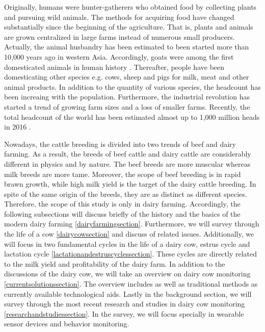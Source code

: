 \documentclass[english,12pt,a4paper,pdftex,elec,utf8]{aaltothesis}
\begin{document}
Originally, humans were hunter-gatherers who obtained food by collecting plants and pursuing wild animals. The methods for acquiring food have changed substantially since the beginning of the agriculture. That is, plants and animals are grown centralized in large farms instead of numerous small producers. Actually, the animal husbandry has been estimated to been started more than 10,000 years ago in western Asia. Accordingly, goats were among the first domesticated animals in human history \cite{ancienthistoryofmilk}. Thereafter, people have been domesticating other species e.g. cows, sheep and pigs for milk, meat and other animal products. In addition to the quantity of various species, the headcount has been increaing with the population. Furthermore, the industrial revolution has started a trend of growing farm sizes and a loss of smaller farms. Recently, the total headcount of the world has been estimated almost up to 1,000 million heads in 2016 \cite{livestockandpoultry}.

Nowadays, the cattle breeding is divided into two trends of beef and dairy farming. As a result, the breeds of beef cattle and dairy cattle are considerably different in physics and by nature. The beef breeds are more muscular whereas milk breeds are more tame. Moreover, the scope of beef breeding is in rapid brawn growth, while high milk yield is the target of the dairy cattle breeding. In spite of the same origin of the breeds, they are as distinct as different species. Therefore, the scope of this study is only in dairy farming. Accordingly, the following subsections will discuss briefly of the history and the basics of the modern dairy farming \ref{dairyfarmingsection}. Furthermore, we will survey through the life of a cow \ref{dairycowsection} and discuss of related issues. Additionally, we will focus in two fundamental cycles in the life of a dairy cow, estrus cycle and lactation cycle \ref{lactationandestruscyclessection}. These cycles are directly related to the milk yield and profitability of the dairy farm. In addition to the discussions of the dairy cow, we will take an overview on dairy cow monitoring \ref{currentsolutionssection}. The overview includes as well as traditional methods as currently available technological aids. Lastly in the background section, we will survey through the most recent research and studies in dairy cow monitoring \ref{researchandstudiessection}. In the survey, we will focus specially in wearable sensor devices and behavior monitoring.

\end{document}
